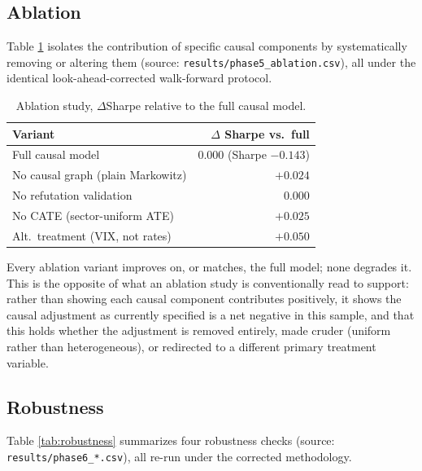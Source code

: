 \documentclass[10pt,twocolumn]{article}
\begin{document}
\subsection{Ablation}
Table \ref{tab:ablation} isolates the contribution of specific causal
components by systematically removing or altering them (source:
\texttt{results/phase5\_ablation.csv}), all under the identical
look-ahead-corrected walk-forward protocol.

\begin{table}[h]
\centering
\small
\caption{Ablation study, $\Delta$Sharpe relative to the full causal model.}
\label{tab:ablation}
\begin{tabular}{lr}
\toprule
Variant & $\Delta$ Sharpe vs.\ full \\
\midrule
Full causal model & $0.000$ (Sharpe $-0.143$) \\
No causal graph (plain Markowitz) & $+0.024$ \\
No refutation validation & $0.000$ \\
No CATE (sector-uniform ATE) & $+0.025$ \\
Alt.\ treatment (VIX, not rates) & $+0.050$ \\
\bottomrule
\end{tabular}
\end{table}

Every ablation variant improves on, or matches, the full model; none
degrades it. This is the opposite of what an ablation study is
conventionally read to support: rather than showing each causal
component contributes positively, it shows the causal adjustment as
currently specified is a net negative in this sample, and that this
holds whether the adjustment is removed entirely, made cruder (uniform
rather than heterogeneous), or redirected to a different primary
treatment variable.

\subsection{Robustness}
Table \ref{tab:robustness} summarizes four robustness checks (source:
\texttt{results/phase6\_*.csv}), all re-run under the corrected
methodology.
\end{document}
